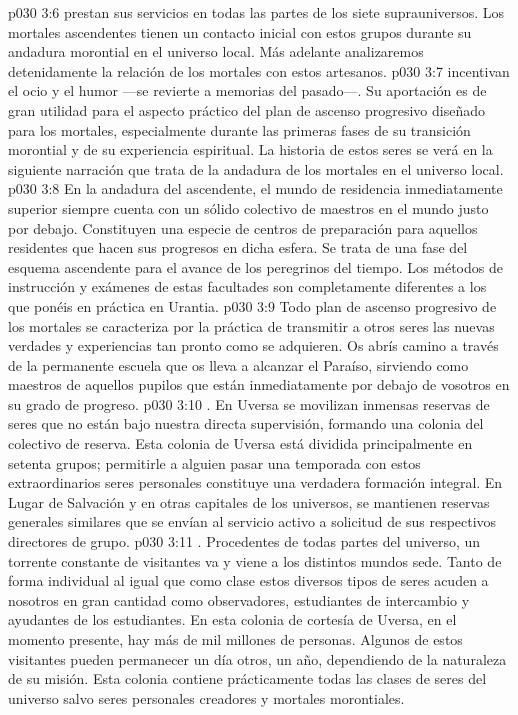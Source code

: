 \vs p030 3:6  prestan sus servicios en todas las partes de los siete suprauniversos. Los mortales ascendentes tienen un contacto inicial con estos grupos durante su andadura morontial en el universo local. Más adelante analizaremos detenidamente la relación de los mortales con estos artesanos.
\vs p030 3:7  incentivan el ocio y el humor ---se revierte a memorias del pasado---. Su aportación es de gran utilidad para el aspecto práctico del plan de ascenso progresivo diseñado para los mortales, especialmente durante las primeras fases de su transición morontial y de su experiencia espiritual. La historia de estos seres se verá en la siguiente narración que trata de la andadura de los mortales en el universo local.
\vs p030 3:8  En la andadura del ascendente, el mundo de residencia inmediatamente superior siempre cuenta con un sólido colectivo de maestros en el mundo justo por debajo. Constituyen una especie de centros de preparación para aquellos residentes que hacen sus progresos en dicha esfera. Se trata de una fase del esquema ascendente para el avance de los peregrinos del tiempo. Los métodos de instrucción y exámenes de estas facultades son completamente diferentes a los que ponéis en práctica en Urantia.
\vs p030 3:9 Todo plan de ascenso progresivo de los mortales se caracteriza por la práctica de transmitir a otros seres las nuevas verdades y experiencias tan pronto como se adquieren. Os abrís camino a través de la permanente escuela que os lleva a alcanzar el Paraíso, sirviendo como maestros de aquellos pupilos que están inmediatamente por debajo de vosotros en su grado de progreso.
\vs p030 3:10 . En Uversa se movilizan inmensas reservas de seres que no están bajo nuestra directa supervisión, formando una colonia del colectivo de reserva. Esta colonia de Uversa está dividida principalmente en setenta grupos; permitirle a alguien pasar una temporada con estos extraordinarios seres personales constituye una verdadera formación integral. En Lugar de Salvación y en otras capitales de los universos, se mantienen reservas generales similares que se envían al servicio activo a solicitud de sus respectivos directores de grupo.
\vs p030 3:11 . Procedentes de todas partes del universo, un torrente constante de visitantes va y viene a los distintos mundos sede. Tanto de forma individual al igual que como clase estos diversos tipos de seres acuden a nosotros en gran cantidad como observadores, estudiantes de intercambio y ayudantes de los estudiantes. En esta colonia de cortesía de Uversa, en el momento presente, hay más de mil millones de personas. Algunos de estos visitantes pueden permanecer un día otros, un año, dependiendo de la naturaleza de su misión. Esta colonia contiene prácticamente todas las clases de seres del universo salvo seres personales creadores y mortales morontiales.
